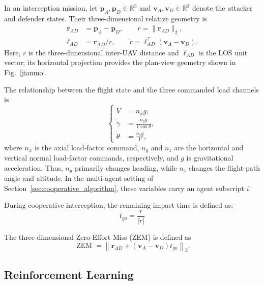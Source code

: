 \documentclass[lettersize,journal]{IEEEtran}
\begin{document}
In an interception mission, let $\mathbf p_A,\mathbf p_D\in\mathbb R^3$ and
$\mathbf v_A,\mathbf v_D\in\mathbb R^3$ denote the attacker and defender states. Their
three-dimensional relative geometry is
\begin{equation}
\label{gongfang}
\begin{aligned}
\mathbf r_{AD}&=\mathbf p_A-\mathbf p_D,\qquad
r=\|\mathbf r_{AD}\|_2,\\
\boldsymbol\ell_{AD}&=\mathbf r_{AD}/r,\qquad
\dot r=\boldsymbol\ell_{AD}^{\top}(\mathbf v_A-\mathbf v_D).
\end{aligned}
\end{equation}
Here, $r$ is the three-dimensional inter-UAV distance and
$\boldsymbol\ell_{AD}$ is the LOS unit vector; its horizontal projection provides the
plan-view geometry shown in Fig.~\ref{jianmo}.

The relationship between the flight state and the three commanded load channels is
\begin{equation}
\label{guozai}
\left\{\begin{aligned}
\dot V&=n_xg,\\
\dot\gamma&=\frac{n_yg}{V\cos\theta},\\
\dot\theta&=\frac{n_zg}{V},
\end{aligned}\right.
\end{equation}
where $n_x$ is the axial load-factor command, $n_y$ and $n_z$ are the horizontal and vertical
normal load-factor commands, respectively, and $g$ is gravitational acceleration. Thus,
$n_y$ primarily changes heading, while $n_z$ changes the flight-path angle and altitude.
In the multi-agent setting of Section~\ref{sec:cooperative_algorithm}, these variables carry
an agent subscript $i$.

During cooperative interception, the remaining impact time is defined as:
\begin{equation}
\label{shijian}
t_{go}=\frac{r}{\left|\dot{r}\right|}
\end{equation}

The three-dimensional Zero-Effort Miss (ZEM) is defined as
\begin{equation}
\label{ZEM}
\operatorname{ZEM}=\left\|\mathbf r_{AD}
+(\mathbf v_A-\mathbf v_D)t_{go}\right\|_2.
\end{equation}

\endgroup
\subsection{Reinforcement Learning}
\end{document}
